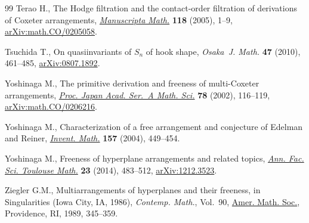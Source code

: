 \begin{thebibliography}{99}
Terao H., The {H}odge filtration and the contact-order filtration of
 derivations of {C}oxeter arrangements, \href{https://doi.org/10.1007/s00229-004-0536-z}{\textit{Manuscripta Math.}}
 \textbf{118} (2005), 1--9, \href{https://arxiv.org/abs/math.CO/0205058}{arXiv:math.CO/0205058}.

Tsuchida T., On quasiinvariants of {$S_n$} of hook shape, \textit{Osaka~J.
 Math.} \textbf{47} (2010), 461--485, \href{https://arxiv.org/abs/0807.1892}{arXiv:0807.1892}.

Yoshinaga M., The primitive derivation and freeness of multi-{C}oxeter
 arrangements, \href{https://doi.org/10.3792/pjaa.78.116}{\textit{Proc. Japan Acad. Ser.~A Math. Sci.}} \textbf{78}
 (2002), 116--119, \href{https://arxiv.org/abs/math.CO/0206216}{arXiv:math.CO/0206216}.

Yoshinaga M., Characterization of a free arrangement and conjecture of
 {E}delman and {R}einer, \href{https://doi.org/10.1007/s00222-004-0359-2}{\textit{Invent. Math.}} \textbf{157} (2004), 449--454.

Yoshinaga M., Freeness of hyperplane arrangements and related topics,
 \href{https://doi.org/10.5802/afst.1413}{\textit{Ann. Fac. Sci. Toulouse Math.}} \textbf{23} (2014), 483--512,
 \href{https://arxiv.org/abs/1212.3523}{arXiv:1212.3523}.

Ziegler G.M., Multiarrangements of hyperplanes and their freeness, in
 Singularities ({I}owa {C}ity, {IA}, 1986), \textit{Contemp. Math.}, Vol.~90,
 \href{https://doi.org/10.1090/conm/090/1000610}{Amer. Math. Soc.}, Providence, RI, 1989, 345--359.

\end{thebibliography}
